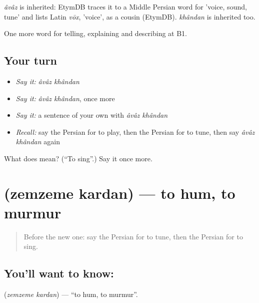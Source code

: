 \begin{cousinweb}
\emph{âvâz} is inherited: EtymDB traces it to a Middle Persian word for 'voice, sound, tune' and lists Latin \emph{vōx}, 'voice', as a cousin (EtymDB). \emph{khândan} is inherited too.
\end{cousinweb}

\begin{grammarlens}[title={What you've built}]
One more word for telling, explaining and describing at B1.
\end{grammarlens}

\subsection*{Your turn}
\begin{itemize}
\raggedright
  \item \emph{Say it:} \emph{âvâz khândan}
  \item \emph{Say it:} \emph{âvâz khândan}, once more
  \item \emph{Say it:} a sentence of your own with \emph{âvâz khândan}
  \item \emph{Recall:} say the Persian for to play, then the Persian for to tune, then say \emph{âvâz khândan} again
\end{itemize}

\begin{tcolorbox}[breakable,colback=teal!4,colframe=teal!35!black,title={Before you move on}]
What does   mean? (\textquotedblleft{}To sing\textquotedblright{}.) Say it once more.
\end{tcolorbox}
\section[\texorpdfstring{\fa{زمزمه} \fa{کردن} (zemzeme kardan)}{زمزمه کردن (zemzeme kardan)}]{  (zemzeme kardan) — to hum, to murmur}

\label{lesson:FA-C519-zemzeme-kardan}



\begin{quote}
Before the new one: say the Persian for to tune, then the Persian for to sing.
\end{quote}

\subsection*{You'll want to know:  }
\textbf{ } (\emph{zemzeme kardan}) — \textquotedblleft{}to hum, to murmur\textquotedblright{}.

